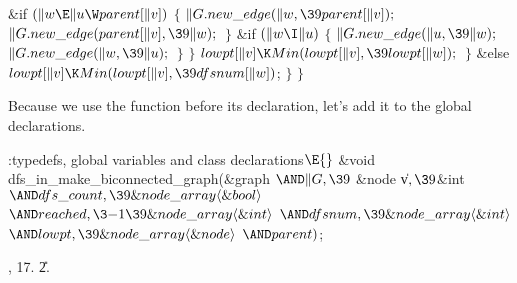 \&{if} ${}(\|w\E\|u\W\\{parent}[\|v]){}$\5
${}\{{}$\1\6
${}\|G.\\{new\_edge}(\|w,\39\\{parent}[\|v]);{}$\6
${}\|G.\\{new\_edge}(\\{parent}[\|v],\39\|w);{}$\6
\4${}\}{}$\2\6
\&{if} ${}(\|w\I\|u){}$\5
${}\{{}$\1\6
${}\|G.\\{new\_edge}(\|u,\39\|w);{}$\6
${}\|G.\\{new\_edge}(\|w,\39\|u);{}$\6
\4${}\}{}$\2\6
\4${}\}{}$\2\6
${}\\{lowpt}[\|v]\K\\{Min}(\\{lowpt}[\|v],\39\\{lowpt}[\|w]);{}$\6
\4${}\}{}$\2\6
\&{else}\1\5
${}\\{lowpt}[\|v]\K\\{Min}(\\{lowpt}[\|v],\39\\{dfsnum}[\|w]){}$;\2\6
\4${}\}{}$\2\6
\4${}\}{}$\2\par
\fi

Because we use the function 
before its declaration,
let's add it to the global declarations.

\Y\B\4:typedefs, global variables and class declarations\X${}\E{}$\6
\&{void} \\{dfs\_in\_make\_biconnected\_graph}(\&{graph} ${}{\AND}\|G,\39{}$%
\&{node} \|v${},\39{}$\&{int} ${}{\AND}\\{dfs\_count},\39\&{node\_array}\langle%
\&{bool}\rangle{}$ ${}{\AND}\\{reached},\3{-1}\39\&{node\_array}\langle\&{int}%
\rangle{}$ ${}{\AND}\\{dfsnum},\39\&{node\_array}\langle\&{int}\rangle{}$ ${}{%
\AND}\\{lowpt},\39\&{node\_array}\langle\&{node}\rangle{}$ ${}{\AND}%
\\{parent}){}$;\par
{}, 17.
\U2.\fi

